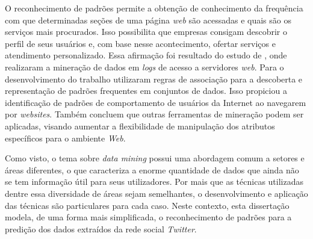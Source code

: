 O reconhecimento de padrões permite a obtenção de conhecimento da frequência com que determinadas seções de uma página \textit{web} são acessadas e quais são os serviços mais procurados. Isso possibilita que empresas consigam descobrir o perfil de seus usuários e, com base nesse acontecimento, ofertar serviços e atendimento personalizado. Essa afirmação foi resultado do estudo de , onde realizaram a mineração de dados em \textit{logs} de acesso a servidores \textit{web}. Para o desenvolvimento do trabalho utilizaram regras de associação para a descoberta e representação de padrões frequentes em conjuntos de dados. Isso propiciou a identificação de padrões de comportamento de usuários da Internet ao navegarem por \textit{websites}. Também concluem que outras ferramentas de mineração podem ser aplicadas, visando aumentar a flexibilidade de manipulação dos atributos específicos para o ambiente \textit{Web}.

Como visto, o tema sobre \textit{data mining} possui uma abordagem comum a setores e áreas diferentes, o que caracteriza a enorme quantidade de dados que ainda não se tem informação útil para seus utilizadores. Por mais que as técnicas utilizadas dentre essa diversidade de áreas sejam semelhantes, o desenvolvimento e aplicação das técnicas são particulares para cada caso. Neste contexto, esta dissertação modela, de uma forma mais simplificada, o reconhecimento de padrões para a predição dos dados extraídos da rede social \textit{Twitter}.











